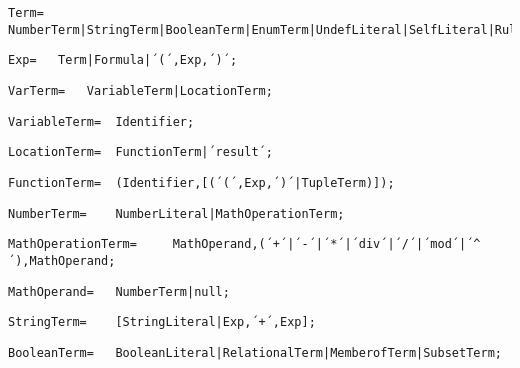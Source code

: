 \documentclass{article}
\begin{document}
    \begin{lstlisting}[mathescape=true]
     Term= 	NumberTerm|StringTerm|BooleanTerm|EnumTerm|UndefLiteral|SelfLiteral|RuleAsTerm|ValueTerm|StructureTerm;
    \end{lstlisting}
    
    \begin{lstlisting}[mathescape=true]
     Exp= 	Term|Formula|´(´,Exp,´)´;
    \end{lstlisting}
    
    \begin{lstlisting}[mathescape=true]
     VarTerm= 	VariableTerm|LocationTerm;
    \end{lstlisting}
    
    \begin{lstlisting}[mathescape=true]
     VariableTerm= 	Identifier;
    \end{lstlisting}
    
    \begin{lstlisting}[mathescape=true]
     LocationTerm= 	FunctionTerm|´result´;
    \end{lstlisting}
    
    \begin{lstlisting}[mathescape=true]
     FunctionTerm= 	(Identifier,[(´(´,Exp,´)´|TupleTerm)]);
    \end{lstlisting}
    
    \begin{lstlisting}[mathescape=true]
     NumberTerm= 	NumberLiteral|MathOperationTerm;
    \end{lstlisting}
    
    \begin{lstlisting}[mathescape=true]
     MathOperationTerm= 	MathOperand,(´+´|´-´|´*´|´div´|´/´|´mod´|´^´),MathOperand;
    \end{lstlisting}
    
    \begin{lstlisting}[mathescape=true]
     MathOperand= 	NumberTerm|null;
    \end{lstlisting}
    
    \begin{lstlisting}[mathescape=true]
     StringTerm= 	[StringLiteral|Exp,´+´,Exp];
    \end{lstlisting}
    
    \begin{lstlisting}[mathescape=true]
     BooleanTerm= 	BooleanLiteral|RelationalTerm|MemberofTerm|SubsetTerm;
    \end{lstlisting}
    
\end{document}
